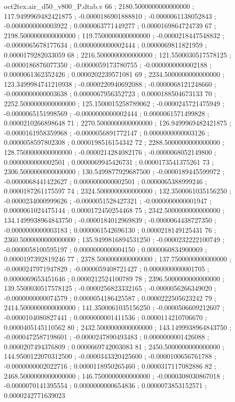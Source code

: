 \begin{filecontents}[overwrite]{oct2tex.air_d50_v800_P.dtab.v}
66 ; 2180.5000000000000000 ; 117.9499969482421875 ; -0.0000186901888810 ; -0.0000061138052843 ; -0.0000000000003922 ; 0.0000063771449277 ; 0.0000169864724739
67 ; 2198.5000000000000000 ; 119.7500000000000000 ; -0.0000218447548832 ; -0.0000065678177634 ; 0.0000000000002444 ; 0.0000069811821959 ; 0.0000179282033059
68 ; 2216.5000000000000000 ; 121.5500030517578125 ; -0.0000186876077350 ; -0.0000059173780755 ; -0.0000000000002188 ; 0.0000061362352426 ; 0.0000202239571081
69 ; 2234.5000000000000000 ; 123.3499984741210938 ; -0.0000220940692088 ; -0.0000068121248660 ; -0.0000000000003638 ; 0.0000067956352723 ; 0.0000188504673133
70 ; 2252.5000000000000000 ; 125.1500015258789062 ; -0.0000245721475949 ; -0.0000065151998569 ; -0.0000000000002444 ; 0.0000061571499828 ; 0.0000210266898648
71 ; 2270.5000000000000000 ; 126.9499969482421875 ; -0.0000161958359968 ; -0.0000056891772147 ; 0.0000000000003126 ; 0.0000058597802308 ; 0.0000198516154342
72 ; 2288.5000000000000000 ; 128.7500000000000000 ; -0.0000214284082176 ; -0.0000068052149800 ; 0.0000000000002501 ; 0.0000069945426731 ; 0.0000173541375261
73 ; 2306.5000000000000000 ; 130.5499877929687500 ; -0.0000189445599972 ; -0.0000068441422627 ; 0.0000000000002501 ; 0.0000065388999246 ; 0.0000187261175597
74 ; 2324.5000000000000000 ; 132.3500061035156250 ; -0.0000234000999626 ; -0.0000051528427321 ; -0.0000000000001947 ; 0.0000061024475144 ; 0.0000172450254468
75 ; 2342.5000000000000000 ; 134.1499938964843750 ; -0.0000184012969839 ; -0.0000064438727350 ; -0.0000000000003183 ; 0.0000061542696130 ; 0.0000218149125431
76 ; 2360.5000000000000000 ; 135.9499816894531250 ; -0.0000232222100749 ; -0.0000058100595197 ; 0.0000000000004150 ; 0.0000060834900069 ; 0.0000197392819246
77 ; 2378.5000000000000000 ; 137.7500000000000000 ; -0.0000247971947829 ; -0.0000059408721427 ; 0.0000000000001705 ; 0.0000069653451646 ; 0.0000212524100789
78 ; 2396.5000000000000000 ; 139.5500030517578125 ; -0.0000256823332165 ; -0.0000056266349020 ; -0.0000000000074579 ; 0.0000054186425587 ; 0.0000222505623242
79 ; 2414.5000000000000000 ; 141.3500061035156250 ; -0.0000506609212607 ; -0.0000104080827441 ; 0.0000000001411536 ; 0.0000114210706670 ; 0.0000405145110562
80 ; 2432.5000000000000000 ; 143.1499938964843750 ; -0.0000472587198601 ; -0.0000247890493483 ; 0.0000000001426088 ; 0.0000207494376809 ; 0.0000669742003083
81 ; 2450.5000000000000000 ; 144.9500122070312500 ; -0.0000343320425600 ; -0.0000100656761788 ; -0.0000000002022716 ; 0.0000118950265460 ; 0.0000317117082886
82 ; 2468.5000000000000000 ; 146.7500000000000000 ; -0.0000308030867018 ; -0.0000070141395554 ; 0.0000000000654836 ; 0.0000073853152571 ; 0.0000242771639023

\end{filecontents}
